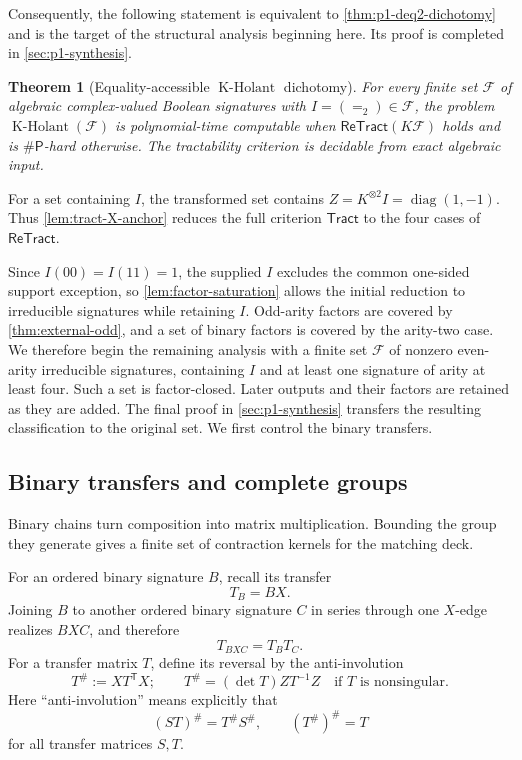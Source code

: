 \documentclass[11pt,letterpaper,onecolumn]{article}
\theoremstyle{plain}
\newtheorem{theorem}{Theorem}[section]
\theoremstyle{definition}
\theoremstyle{remark}
\newcommand{\cF}{\mathcal F}
\newcommand{\KHolant}{\operatorname{K\text{-}Holant}}
\newcommand{\Tract}{\mathsf{Tract}}
\newcommand{\ReTract}{\mathsf{ReTract}}
\newcommand{\SharpP}{\#\mathsf P}
\newcommand{\diag}{\operatorname{diag}}
\newcommand{\Eq}{=}
\begin{document}
Consequently, the following statement is equivalent to
\cref{thm:p1-deq2-dichotomy} and is the target of the structural analysis
beginning here.  Its proof is completed in \cref{sec:p1-synthesis}.

\begin{theorem}[Equality-accessible \(\KHolant\) dichotomy]
\label{thm:p1-eq2-kholant-dichotomy}
For every finite set \(\cF\) of algebraic complex-valued Boolean signatures
with \(I=(\Eq_2)\in\cF\), the problem \(\KHolant(\cF)\) is polynomial-time
computable when \(\ReTract(K\cF)\) holds and is \(\SharpP\)-hard otherwise.
The tractability criterion is decidable from exact algebraic input.
\end{theorem}

For a set containing \(I\), the transformed set contains
\(Z=K^{\otimes2}I=\diag(1,-1)\).  Thus \cref{lem:tract-X-anchor}
reduces the full criterion \(\Tract\) to the four cases of
\(\ReTract\).

Since \(I(00)=I(11)=1\), the supplied \(I\) excludes the common one-sided support exception, so
\cref{lem:factor-saturation} allows the initial reduction to irreducible
signatures while retaining \(I\). Odd-arity factors are covered by
\cref{thm:external-odd}, and a set of binary factors is covered by the
arity-two case. We therefore begin the remaining analysis with a finite
set \(\cF\) of nonzero even-arity irreducible signatures, containing
\(I\) and at least one signature of arity at least four. Such a set is
factor-closed. Later outputs and their factors are retained as they are
added. The final proof in \cref{sec:p1-synthesis} transfers the resulting
classification to the original set. We first control the binary transfers.

\subsection{Binary transfers and complete groups}
\label{subsec:binary-transfer-control}
Binary chains turn composition into matrix multiplication.  Bounding the
group they generate gives a finite set of contraction kernels for the
matching deck.

For an ordered binary signature \(B\), recall its transfer
\[
  T_B=BX.
\]
Joining \(B\) to another ordered binary signature \(C\) in series through
one \(X\)-edge realizes \(BXC\),
and therefore
\[
  T_{BXC}=T_BT_C.
\]
For a transfer matrix \(T\), define its reversal by the anti-involution
\begin{equation}
  T^\#:=XT^{\mathsf T}X;
  \qquad
  T^\#=(\det T)ZT^{-1}Z\quad\text{if }T\text{ is nonsingular}.
  \label{eq:transfer-reversal}
\end{equation}
Here ``anti-involution'' means explicitly that
\[
  (ST)^\#=T^\#S^\#,
  \qquad
  (T^\#)^\#=T
\]
for all transfer matrices \(S,T\).
\end{document}
